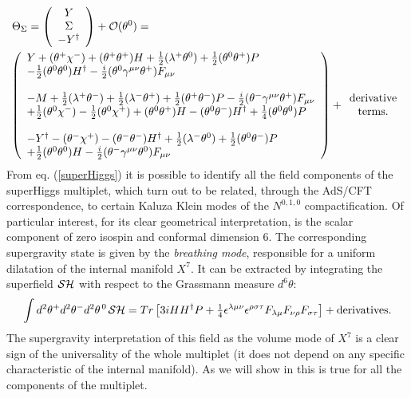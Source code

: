 \documentclass[a4paper,12pt]{article}
\newcommand{\ft}[2]{{\textstyle\frac{#1}{#2}}}
\def\n010{N^{0,1,0}}
\begin{document}
\begin{eqnarray}
  \Theta_\Sigma=\left(\begin{array}{c}
  Y\\
  \Sigma\\
  -Y^\dagger
  \end{array}\right)+{\cal O}(\theta^0)=\hspace{8cm}\\
  \left(\begin{array}{l}
  Y+(\theta^+\chi^-)+(\theta^+\theta^+)H+\ft{1}{2}(\lambda^+\theta^0)
  +\ft{1}{2}(\theta^0\theta^+)P\\
  -\ft{1}{2}(\theta^0\theta^0)H^\dagger
  -\ft{i}{2}(\theta^0\gamma^{\mu\nu}\theta^+)F_{\mu\nu}\\
  \\
  -M+\ft{1}{2}(\lambda^+\theta^-)+\ft{1}{2}(\lambda^-\theta^+)
  +\ft{1}{2}(\theta^+\theta^-)P-\ft{i}{2}(\theta^-\gamma^{\mu\nu}\theta^+)F_{\mu\nu}\\
  +\ft{1}{2}(\theta^0\chi^-)-\ft{1}{2}(\theta^0\chi^+)+(\theta^0\theta^+)H
  -(\theta^0\theta^-)H^\dagger+\ft{1}{4}(\theta^0\theta^0)P\\
  \\
  -Y^\dagger-(\theta^-\chi^+)-(\theta^-\theta^-)H^\dagger+\ft{1}{2}(\lambda^-\theta^0)
  +\ft{1}{2}(\theta^0\theta^-)P\\
  +\ft{1}{2}(\theta^0\theta^0)H
  -\ft{i}{2}(\theta^-\gamma^{\mu\nu}\theta^0)F_{\mu\nu}
  \end{array}\right)+
  \begin{array}{c}
  {\rm derivative}\\
  {\rm terms.}\nonumber
  \end{array}
\end{eqnarray}
From eq. (\ref{superHiggs}) it is possible to identify all the field
components of the superHiggs multiplet, which turn out to be related,
through the AdS/CFT correspondence, to certain Kaluza Klein modes of
the $\n010$ compactification.
Of particular interest, for its clear geometrical interpretation, is
the scalar component of zero isospin and conformal dimension $6$.
The corresponding supergravity state is given by the {\it breathing
mode}, responsible for a uniform dilatation of the internal manifold
$X^7$.
It can be extracted by integrating the superfield ${\cal SH}$ with
respect to the Grassmann measure $d^6\theta$:
\begin{equation}
\int d^2\theta^+ d^2\theta^- d^2\theta^{\,0\,}
{\cal SH}=Tr\left[3i HH^\dagger P+\ft{1}{4}\epsilon^{\lambda\mu\nu}
\epsilon^{\rho\sigma\tau}F_{\lambda\mu}F_{\nu\rho}F_{\sigma\tau}\right]
+{\rm derivatives}.
\label{FFF}
\end{equation}
The supergravity interpretation of this field as the volume mode of
$X^7$ is a clear sign of the universality of the whole multiplet (it
does not depend on any specific characteristic of the internal manifold).
As we will show in \cite{noinext} this is true for all the components
of the multiplet.
\end{document}

